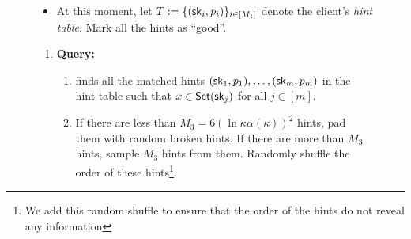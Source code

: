 \begin{figure}[p]
\begin{minipage}{\textwidth}
\begin{mdframed}
\begin{itemize}[leftmargin=3mm,itemsep=1pt]
                \item At this moment, let $T := \{({\sf sk}_i, p_i )\}_{i \in
                [M_1]}$ denote the client's {\it hint table}. Mark all the hints
                as ``good''.
            \end{itemize}
            
            
            
            
            \begin{enumerate}[leftmargin=5mm,itemsep=1pt]
                \item 
                {\bf Query:}
                \begin{enumerate}[leftmargin=5mm,itemsep=1pt]
                    \item 
                    \Client finds all the matched hints
                    $(\mathsf{sk}_1,p_1),\dots,(\mathsf{sk}_m,p_m)$ in the hint table  such that
                    $x\in \mathsf{Set}(\mathsf{sk}_j)$ for all $j\in[m]$.
                    
                    \item 
                    If there are less than $M_3=6(\ln \kappa \alpha(\kappa))^2$
                    hints, pad them with random broken hints. If there are more
                    than $M_3$ hints, sample $M_3$ hints from them. Randomly
                    shuffle the order of these hints\footnote{We add this random
                    shuffle to ensure that the order of the hints do not reveal
                    any information}.
                    
                    
                    

\end{enumerate}
\end{enumerate}
\end{mdframed}
\end{minipage}
\end{figure}
